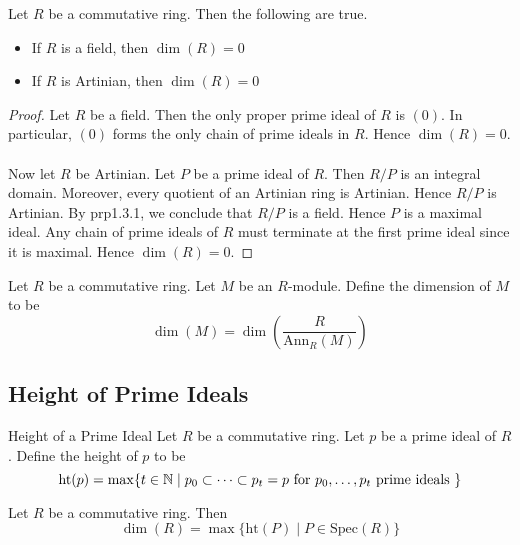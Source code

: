 \documentclass[a4paper]{article}
\begin{document}
\begin{lmm}{}{} Let $R$ be a commutative ring. Then the following are true. 
\begin{itemize}
\item If $R$ is a field, then $\dim(R)=0$
\item If $R$ is Artinian, then $\dim(R)=0$
\end{itemize} \tcbline
\begin{proof}
Let $R$ be a field. Then the only proper prime ideal of $R$ is $(0)$. In particular, $(0)$ forms the only chain of prime ideals in $R$. Hence $\dim(R)=0$. \\~\\

Now let $R$ be Artinian. Let $P$ be a prime ideal of $R$. Then $R/P$ is an integral domain. Moreover, every quotient of an Artinian ring is Artinian. Hence $R/P$ is Artinian. By prp1.3.1, we conclude that $R/P$ is a field. Hence $P$ is a maximal ideal. Any chain of prime ideals of $R$ must terminate at the first prime ideal since it is maximal. Hence $\dim(R)=0$. 
\end{proof}
\end{lmm}

\begin{defn}{}{} Let $R$ be a commutative ring. Let $M$ be an $R$-module. Define the dimension of $M$ to be $$\dim(M)=\dim\left(\frac{R}{\text{Ann}_R(M)}\right)$$
\end{defn}

\subsection{Height of Prime Ideals}
\begin{defn}{Height of a Prime Ideal}{} Let $R$ be a commutative ring. Let $p$ be a prime ideal of $R$. Define the height of $p$ to be $$\text{ht}(p)=\max\{t\in\mathbb{N}\;|\;p_0\subset\dots\subset p_t=p\text{ for }p_0,\dots,p_t\text{ prime ideals }\}$$
\end{defn}

\begin{lmm}{}{} Let $R$ be a commutative ring. Then $$\dim(R)=\max\{\text{ht}(P)\;|\;P\in\text{Spec}(R)\}$$
\end{lmm}
\end{document}
